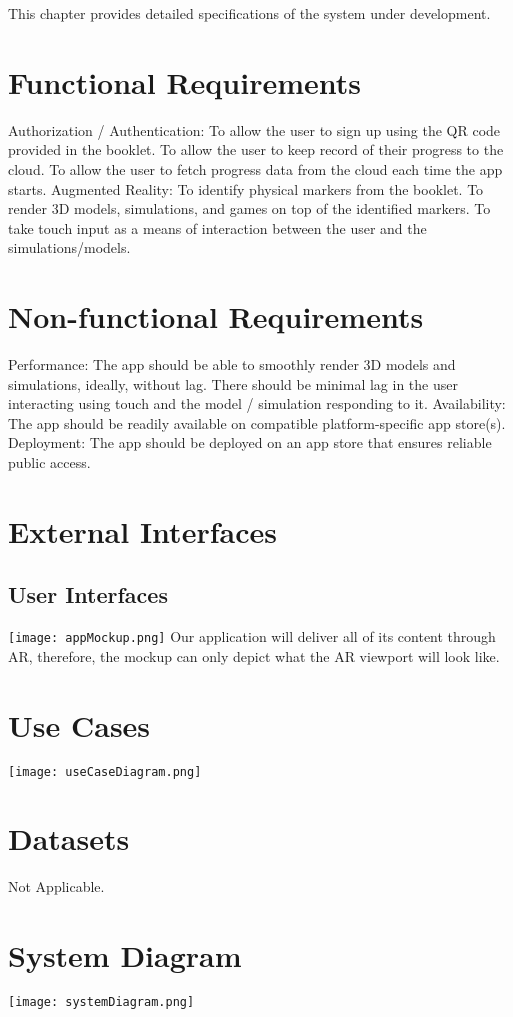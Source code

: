 This chapter provides detailed specifications of the system under development.

\section{Functional Requirements}
\begin{outline}
  \1 Authorization / Authentication:
  \2 To allow the user to sign up using the QR code provided in the booklet.
  \2 To allow the user to keep record of their progress to the cloud.
  \2 To allow the user to fetch progress data from the cloud each time the app starts.
  \1 Augmented Reality:
  \2 To identify physical markers from the booklet.
  \2 To render 3D models, simulations, and games on top of the identified markers.
  \2 To take touch input as a means of interaction between the user and the simulations/models.
\end{outline}


\section{Non-functional Requirements}
\begin{outline}
  \1 Performance:
  \2 The app should be able to smoothly render 3D models and simulations, ideally, without lag.
  \2 There should be minimal lag in the user interacting using touch and the model / simulation responding to it.
  \1 Availability:
  \2 The app should be readily available on compatible platform-specific app store(s).
  \1 Deployment:
  \2 The app should be deployed on an app store that ensures reliable public access.
\end{outline}

\section{External Interfaces}
\subsection{User Interfaces}
\texttt{[image: appMockup.png]}
\newline
Our application will deliver all of its content through AR, therefore, the mockup can only depict what the AR viewport will look like.

\section{Use Cases}
\texttt{[image: useCaseDiagram.png]}

\section{Datasets}
Not Applicable.

\section{System Diagram}
\texttt{[image: systemDiagram.png]}